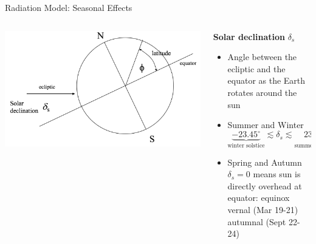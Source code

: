 \begin{frame}{Radiation Model: Seasonal Effects}
\begin{columns}[T]
    \begin{column}{.5\textwidth}
    \begin{minipage}[c][0.7\textheight][c]{\linewidth}
    \includegraphics[width=1\textwidth]{fig4}\\
    \end{minipage}
    \end{column}
    \begin{column}{.5\textwidth}
    \begin{minipage}[c][0.65\textheight][c]{\linewidth}
   \textbf{Solar declination} $\delta_s$
   \begin{itemize}
   	\item Angle between the ecliptic and the equator as the Earth rotates around the sun
   	\item Summer and Winter
   	$$\underbrace{-23.45^\circ}_{\text{winter solstice}} \lesssim \delta_s \lesssim \underbrace{23.45^\circ}_{\text{summer solstice}}$$
   	\item Spring and Autumn\\
   	$\delta_s=0$ means sun is directly overhead at equator: equinox \\vernal  (Mar 19-21) autumnal (Sept 22-24)
   \end{itemize}
      \end{minipage}
    \end{column}
  \end{columns}
\end{frame}
